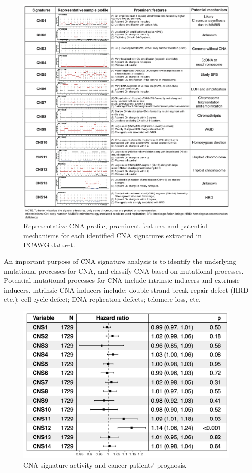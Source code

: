 \documentclass[
]{article}
\begin{document}
\begin{figure}

{\centering \includegraphics[width=1\linewidth]{Figures/CNS-Profile} 

}

\caption{Representative CNA profile, prominent features and potential mechanisms for each identified CNA signatures extracted in PCAWG dataset.}\label{fig:figure4}
\end{figure}

An important purpose of CNA signature analysis is to identify the
underlying mutational processes for CNA, and classify CNA based on
mutational processes. Potential mutational processes for CNA include
intrinsic inducers and extrinsic inducers. Intrinsic CNA inducers
include: double-strand break repair defect (HRD etc.); cell cycle
defect; DNA replication defects; telomere loss, etc.

\begin{figure}

{\centering \includegraphics[width=0.8\linewidth]{Figures/pcawg_cox} 

}

\caption{CNA signature activity and cancer patients’ prognosis.}\label{fig:figure5}
\end{figure}
\end{document}
